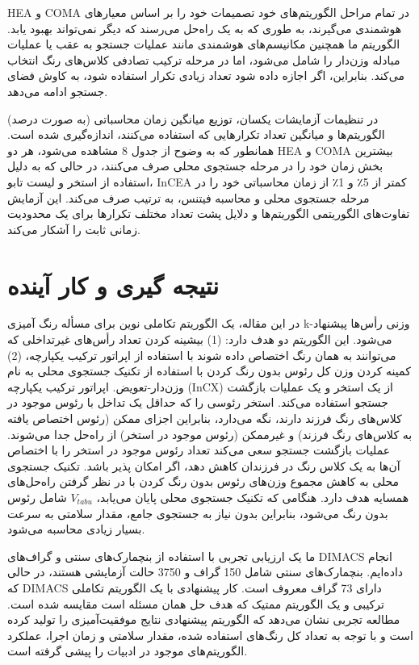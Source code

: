 \documentclass[a4paper,10pt]{article}
\begin{document}
            HEA و COMA در تمام مراحل الگوریتم‌های خود تصمیمات خود را بر اساس معیارهای هوشمندی می‌گیرند، به طوری که به یک راه‌حل می‌رسند که دیگر نمی‌تواند بهبود یابد. الگوریتم ما همچنین مکانیسم‌های هوشمندی مانند عملیات جستجو به عقب یا عملیات مبادله وزن‌دار را شامل می‌شود، اما در مرحله ترکیب تصادفی کلاس‌های رنگ انتخاب می‌کند. بنابراین، اگر اجازه داده شود تعداد زیادی تکرار استفاده شود، به کاوش فضای جستجو ادامه می‌دهد.

            در تنظیمات آزمایشات یکسان، توزیع میانگین زمان محاسباتی (به صورت درصد) الگوریتم‌ها و میانگین تعداد تکرارهایی که استفاده می‌کنند، اندازه‌گیری شده است. همانطور که به وضوح از جدول 8 مشاهده می‌شود، هر دو HEA و COMA بیشترین بخش زمان خود را در مرحله جستجوی محلی صرف می‌کنند، در حالی که به دلیل استفاده از استخر و لیست تابو، InCEA کمتر از 5٪ و 1٪ از زمان محاسباتی خود را در مرحله جستجوی محلی و محاسبه فیتنس، به ترتیب صرف می‌کند. این آزمایش تفاوت‌های الگوریتمی الگوریتم‌ها و دلایل پشت تعداد مختلف تکرارها برای یک محدودیت زمانی ثابت را آشکار می‌کند.

    \section{نتیجه گیری و کار آینده}

        در این مقاله، یک الگوریتم تکاملی نوین برای مسأله رنگ آمیزی k-وزنی رأس‌ها پیشنهاد می‌شود. این الگوریتم دو هدف دارد: (1) بیشینه کردن تعداد رأس‌های غیرتداخلی که می‌توانند به همان رنگ اختصاص داده شوند با استفاده از اپراتور ترکیب یکپارچه، (2) کمینه کردن وزن کل رئوس بدون رنگ کردن با استفاده از تکنیک جستجوی محلی به نام وزن‌دار-تعویض. اپراتور ترکیب یکپارچه (InCX) از یک استخر و یک عملیات بازگشت جستجو استفاده می‌کند. استخر رئوسی را که حداقل یک تداخل با رئوس موجود در کلاس‌های رنگ فرزند دارند، نگه می‌دارد، بنابراین اجزای ممکن (رئوس اختصاص یافته به کلاس‌های رنگ فرزند) و غیرممکن (رئوس موجود در استخر) از راه‌حل جدا می‌شوند. عملیات بازگشت جستجو سعی می‌کند تعداد رئوس موجود در استخر را با اختصاص آن‌ها به یک کلاس رنگ در فرزندان کاهش دهد، اگر امکان پذیر باشد. تکنیک جستجوی محلی به کاهش مجموع وزن‌های رئوس بدون رنگ کردن با در نظر گرفتن راه‌حل‌های همسایه هدف دارد. هنگامی که تکنیک جستجوی محلی پایان می‌یابد، $V_{tabu}$ شامل رئوس بدون رنگ می‌شود، بنابراین بدون نیاز به جستجوی جامع، مقدار سلامتی به سرعت بسیار زیادی محاسبه می‌شود.

        ما یک ارزیابی تجربی با استفاده از بنچمارک‌های سنتی و گراف‌های DIMACS انجام داده‌ایم. بنچمارک‌های سنتی شامل 150 گراف و 3750 حالت آزمایشی هستند، در حالی که DIMACS دارای 73 گراف معروف است. کار پیشنهادی با یک الگوریتم تکاملی ترکیبی و یک الگوریتم ممتیک که هدف حل همان مسئله است مقایسه شده است. مطالعه تجربی نشان می‌دهد که الگوریتم پیشنهادی نتایج موفقیت‌آمیزی را تولید کرده است و با توجه به تعداد کل رنگ‌های استفاده شده، مقدار سلامتی و زمان اجرا، عملکرد الگوریتم‌های موجود در ادبیات را پیشی گرفته است.
\end{document}
